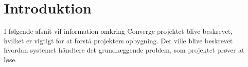 \chapter{Introduktion}

I følgende afsnit vil information omkring Converge projektet blive beskrevet, hvilket er vigtigt for at forstå projekters opbygning. Der ville blive beskrevet hvordan systemet håndtere det grundlæggende problem, som projektet prøver at løse.